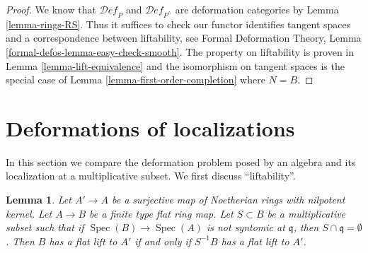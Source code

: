 \documentclass{stacks-project}
\theoremstyle{plain}
\newtheorem{lemma}[subsection]{Lemma}
\theoremstyle{definition}
\theoremstyle{remark}
\numberwithin{equation}{subsection}
\def\Spec{\mathop{\mathrm{Spec}}}
\def\Deformationcategory{\mathcal{D}\!\mathit{ef}}
\begin{document}
\begin{proof}
We know that $\Deformationcategory_P$ and $\Deformationcategory_{P^\wedge}$
are deformation categories by Lemma \ref{lemma-rings-RS}.
Thus it suffices to check
our functor identifies tangent spaces and a correspondence
between liftability, see
Formal Deformation Theory, Lemma \ref{formal-defos-lemma-easy-check-smooth}.
The property on liftability is proven in
Lemma \ref{lemma-lift-equivalence}
and the isomorphism on tangent spaces is the special case of
Lemma \ref{lemma-first-order-completion} where $N = B$.
\end{proof}



\section{Deformations of localizations}
\label{section-compare-localization}

\noindent
In this section we compare the deformation problem posed
by an algebra and its localization at a multiplicative subset.
We first discuss ``liftability''.

\begin{lemma}
\label{lemma-lift-equivalence-localization}
Let $A' \to A$ be a surjective map of Noetherian rings with nilpotent kernel.
Let $A \to B$ be a finite type flat ring map.
Let $S \subset B$ be a multiplicative subset such that
if $\Spec(B) \to \Spec(A)$ is not syntomic at $\mathfrak q$,
then $S \cap \mathfrak q = \emptyset$.
Then $B$ has a flat lift to $A'$ if and only if
$S^{-1}B$ has a flat lift to $A'$.
\end{lemma}
\end{document}

